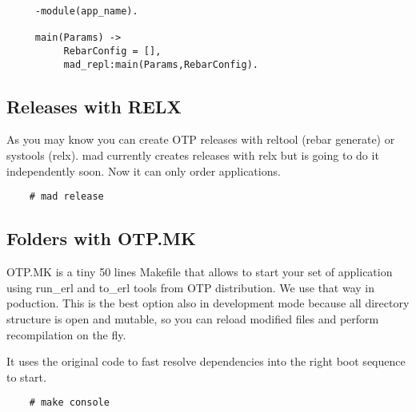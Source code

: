 \vspace{1\baselineskip}
\begin{lstlisting}
     -module(app_name).

     main(Params) -> 
          RebarConfig = [],
          mad_repl:main(Params,RebarConfig).
\end{lstlisting}
\vspace{1\baselineskip}

\subsection{Releases with RELX}

As you may know you can create OTP releases with
reltool (rebar generate) or systools (relx). mad currently
creates releases with relx but is going to do it independently soon.
Now it can only order applications.

\vspace{1\baselineskip}
\begin{lstlisting}
    # mad release
\end{lstlisting}
\vspace{1\baselineskip}

\subsection{Folders with OTP.MK}

OTP.MK is a tiny 50 lines Makefile that allows to start your set
of application using run\_erl and to\_erl tools from OTP distribution.
We use that way in poduction. This is the best option also in
development mode because all directory structure is open and mutable,
so you can reload modified files and perform recompilation on the fly.

It uses the original code to fast resolve dependencies into the right
boot sequence to start.

\vspace{1\baselineskip}
\begin{lstlisting}
    # make console
\end{lstlisting}
\vspace{1\baselineskip}

